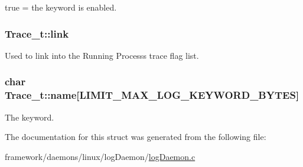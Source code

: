 true = the keyword is enabled. 

\subsubsection[{\texorpdfstring{link}{link}}]{ Trace\+\_\+t\+::link}\hypertarget{struct_trace__t_a54050df9e1810fca96562e2865330660}{}\label{struct_trace__t_a54050df9e1810fca96562e2865330660}


Used to link into the Running Process\textquotesingle{}s trace flag list. 

\subsubsection[{\texorpdfstring{name}{name}}]{\setlength{\rightskip}{0pt plus 5cm}char Trace\+\_\+t\+::name\mbox{[}{\bf L\+I\+M\+I\+T\+\_\+\+M\+A\+X\+\_\+\+L\+O\+G\+\_\+\+K\+E\+Y\+W\+O\+R\+D\+\_\+\+B\+Y\+T\+ES}\mbox{]}}\hypertarget{struct_trace__t_a7900d4ebfa58a6df434932e40304eb8b}{}\label{struct_trace__t_a7900d4ebfa58a6df434932e40304eb8b}


The keyword. 



The documentation for this struct was generated from the following file\+:\begin{DoxyCompactItemize}
\item 
framework/daemons/linux/log\+Daemon/\hyperlink{log_daemon_8c}{log\+Daemon.\+c}\end{DoxyCompactItemize}
